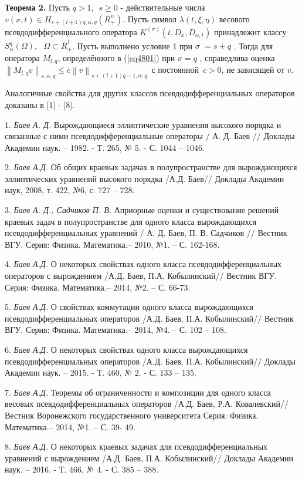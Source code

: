 \textbf{Теорема 2.} Пусть $q > 1,\,\,\,s \geqslant 0$ - действительные числа
$v(x,t) \in H_{s + (l + 1)q,\alpha ,q} (R_ + ^n )$. Пусть символ $\lambda
(t,\xi ,\eta )$ весового псевдодифференциального оператора $K^{(\sigma
)}(t,D_x ,D_{\alpha ,t} )$ принадлежит классу $S_\alpha ^q (\Omega
),\,\,\,\,\Omega \subset \bar {R}_ + ^1 $. Пусть выполнено условие 1 при
$\sigma \,\, = s + q\,\,$. Тогда для оператора $M_{l,q} $, определённого в
(\ref{eq4801}) при $\sigma = q\,\,$, справедлива оценка $\left\| {M_{l,q} v}
\right\|_{s,\alpha ,q} \leqslant c\left\| v \right\|_{s + (l + 1)q - 1,\alpha ,q}
\,$
с постоянной $\,c > 0$, не зависящей от $v$.



Аналогичные свойства для других классов псевдодифференциальных операторов
доказаны в [1] - [8].

\litlist

1. {\it Баев А. Д.} Вырождающиеся эллиптические уравнения высокого порядка и
связанные с ними псевдодифференциальные операторы / А. Д. Баев // Доклады
Академии наук. -- 1982. - Т. 265, № 5. - С. 1044 -- 1046.

2. {\it Баев А.Д.} Об общих краевых задачах в полупространстве для вырождающихся
эллиптических уравнений высокого порядка /А.Д. Баев// Доклады Академии наук,
2008, т. 422, №6, с. 727 -- 728.

3. {\it Баев А. Д., Садчиков П. В.} Априорные оценки и существование решений
краевых задач в полупространстве для одного класса вырождающихся
псевдодифференциальных уравнений / А. Д. Баев, П. В. Садчиков // Вестник
ВГУ. Серия: Физика. Математика.-- 2010, №1. -- С. 162-168.

4. {\it Баев А.Д.} О некоторых свойствах одного класса псевдодифференциальных
операторов с вырождением /А.Д. Баев, П.А. Кобылинский// Вестник ВГУ. Серия:
Физика. Математика.-- 2014, №2. -- С. 66-73.

5. {\it Баев А.Д.} О свойствах коммутации одного класса вырождающихся
псевдодифференциальных операторов /А.Д. Баев, П.А. Кобылинский// Вестник
ВГУ. Серия: Физика. Математика.-- 2014, №4. -- С. 102 -- 108.

6. {\it Баев А.Д.} О некоторых свойствах одного класса вырождающихся
псевдодифференциальных операторов /А.Д. Баев, П.А. Кобылинский// Доклады
Академии наук. -- 2015. - Т. 460, № 2. - С. 133 -- 135.

7. {\it Баев А.Д.} Теоремы об ограниченности и композиции для одного класса
весовых псевдодифференциальных операторов /А.Д. Баев, Р.А. Ковалевский//
Вестник Воронежского государственного университета Серия: Физика.
Математика.-- 2014, №1. -- С. 39- 49.

8. {\it Баев А.Д.} О некоторых краевых задачах для псевдодифференциальных
уравнений с вырождением /А.Д. Баев, П.А. Кобылинский// Доклады Академии
наук. -- 2016. - Т. 466, № 4. - С. 385 -- 388.






